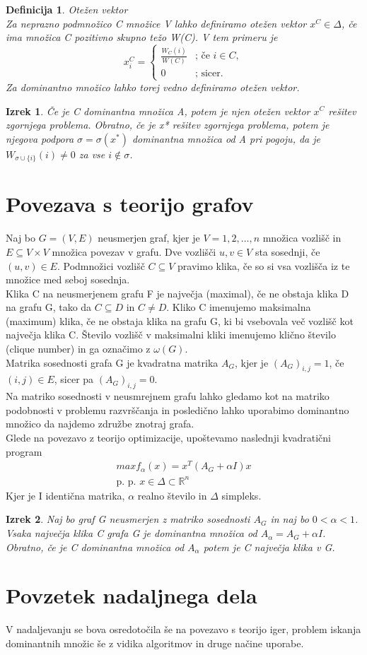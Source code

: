 \documentclass[a4paper]{article}
\newtheorem{definition}{Definicija}[section]
\newtheorem{theorem}{Izrek}
\begin{document}
\begin{definition}{Otežen vektor} \\
Za neprazno podmnožico C množice V lahko definiramo otežen vektor $x^C\in\Delta$, če ima množica C pozitivno skupno težo W(C). V tem primeru je
$$x^C_i=\begin{cases}
\frac{W_C(i)}{W(C)}& \text{; če $i \in C$},\\
0& \text{; sicer}.
\end{cases}$$
Za dominantno množico lahko torej vedno definiramo otežen vektor.
\end{definition}
\begin{theorem}
Če je C dominantna množica A, potem je njen otežen vektor $x^C$ rešitev zgornjega problema. Obratno, če je x* rešitev zgornjega problema, potem je njegova podpora $\sigma = \sigma(x^*)$ dominantna množica od A pri pogoju, da je $W_{\sigma\cup\{i\}}(i) \not= 0$ za vse $i \notin \sigma$.
\end{theorem}

\section{Povezava s teorijo grafov}
Naj bo $G=(V,E)$ neusmerjen graf, kjer je $V={1,2,\ldots,n}$ množica vozlišč in $E\subseteq V\times V$ množica povezav v grafu. Dve vozlišči $u, v \in V$ sta sosednji, če $(u, v) \in E$. Podmnožici vozlišč $C \subseteq V$ pravimo klika, če so si vsa vozlišča iz te množice med seboj sosednja.\\
Klika C na neusmerjenem grafu F je največja (maximal), če ne obstaja klika D na grafu G, tako da $C \subseteq D$ in $C \not= D$. Kliko C imenujemo maksimalna (maximum) klika, če ne obstaja klika na grafu G, ki bi vsebovala več vozlišč kot največja klika C. Število vozlišč v maksimalni kliki imenujemo klično število (clique number) in ga označimo z $\omega(G)$. \\
Matrika sosednosti grafa G je kvadratna matrika $A_G$, kjer je $(A_G)_{i,j}=1$, če $(i,j)\in E$, sicer pa $(A_G)_{i,j}=0$.\\
Na matriko sosednosti v neusmrejnem grafu lahko gledamo kot na matriko podobnosti v problemu razvrščanja in posledično lahko uporabimo dominantno množico da najdemo združbe znotraj grafa.\\
Glede na povezavo z teorijo optimizacije, upoštevamo naslednji kvadratični program
\begin{gather}
max f_\alpha(x) = x^T(A_G + \alpha I)x \\
\text{p. p. } x\in\Delta \subset \mathbb{R}^n
\end{gather}
Kjer je I identična matrika, $\alpha$ realno število in $\Delta$ simpleks.
\begin{theorem}
Naj bo graf G neusmerjen z matriko sosednosti $A_G$ in naj bo $0 < \alpha < 1$. Vsaka največja klika C grafa G je dominantna množica od $A_\alpha = A_G + \alpha I$. Obratno, če je C dominantna množica od $A_\alpha$ potem je C največja klika v G.
\end{theorem}

\section{Povzetek nadaljnega dela}
V nadaljevanju se bova osredotočila še na povezavo s teorijo iger, problem iskanja dominantnih množic še z vidika algoritmov in druge načine uporabe.
\end{document}
